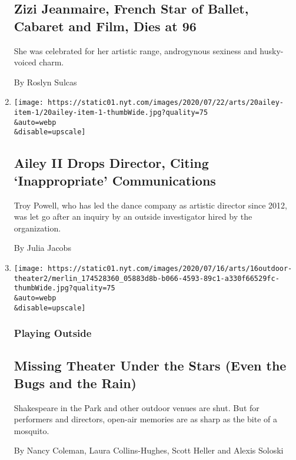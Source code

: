 \begin{enumerate}
  \hypertarget{zizi-jeanmaire-french-star-of-ballet-cabaret-and-film-dies-at-96}{%
  \subsection{Zizi Jeanmaire, French Star of Ballet, Cabaret and Film,
  Dies at
  96}\label{zizi-jeanmaire-french-star-of-ballet-cabaret-and-film-dies-at-96}}

  She was celebrated for her artistic range, androgynous sexiness and
  husky-voiced charm.

  By Roslyn Sulcas
\item
  \href{/2020/07/20/arts/dance/ailey-ii-troy-powell.html}{}

  \texttt{[image: https://static01.nyt.com/images/2020/07/22/arts/20ailey-item-1/20ailey-item-1-thumbWide.jpg?quality=75\\\&auto=webp\\\&disable=upscale]}

  \hypertarget{ailey-ii-drops-director-citing-inappropriate-communications}{%
  \subsection{Ailey II Drops Director, Citing `Inappropriate'
  Communications}\label{ailey-ii-drops-director-citing-inappropriate-communications}}

  Troy Powell, who has led the dance company as artistic director since
  2012, was let go after an inquiry by an outside investigator hired by
  the organization.

  By Julia Jacobs
\item
  \href{/2020/07/16/theater/outdoor-theater-plays.html}{}

  \texttt{[image: https://static01.nyt.com/images/2020/07/16/arts/16outdoor-theater2/merlin\_174528360\_05883d8b-b066-4593-89c1-a330f66529fc-thumbWide.jpg?quality=75\\\&auto=webp\\\&disable=upscale]}

  \hypertarget{playing-outside}{%
  \subsubsection{Playing Outside}\label{playing-outside}}

  \hypertarget{missing-theater-under-the-stars-even-the-bugs-and-the-rain}{%
  \subsection{Missing Theater Under the Stars (Even the Bugs and the
  Rain)}\label{missing-theater-under-the-stars-even-the-bugs-and-the-rain}}

  Shakespeare in the Park and other outdoor venues are shut. But for
  performers and directors, open-air memories are as sharp as the bite
  of a mosquito.

  By Nancy Coleman, Laura Collins-Hughes, Scott Heller and Alexis
  Soloski
\end{enumerate}

